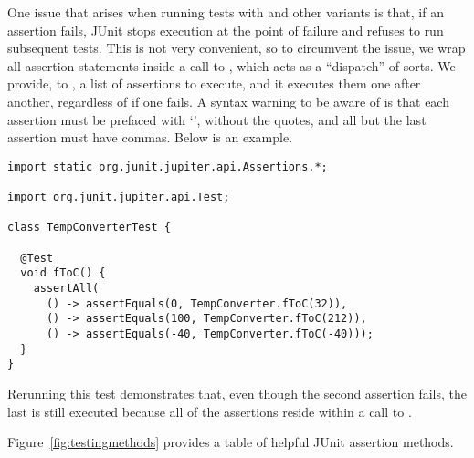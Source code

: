One issue that arises when running tests with  and other variants is that, if an assertion fails, JUnit stops execution at the point of failure and refuses to run subsequent tests.
This is not very convenient, so to circumvent the issue, we wrap all assertion statements inside a call to , which acts as a ``dispatch'' of sorts. 
We provide, to , a list of assertions to execute, and it executes them one after another, regardless of if one fails. 
A syntax warning to be aware of is that each assertion must be prefaced with `\ttt{() -> }', without the quotes, and all but the last assertion must have commas. 
Below is an example.

\begin{lstlisting}[language=MyJava]
import static org.junit.jupiter.api.Assertions.*;

import org.junit.jupiter.api.Test;
  
class TempConverterTest {

  @Test
  void fToC() {
    assertAll(
      () -> assertEquals(0, TempConverter.fToC(32)),
      () -> assertEquals(100, TempConverter.fToC(212)),
      () -> assertEquals(-40, TempConverter.fToC(-40)));
  }
}
\end{lstlisting}
Rerunning this test demonstrates that, even though the second assertion fails, the last is still executed because all of the assertions reside within a call to . 

Figure~\ref{fig:testingmethods} provides a table of helpful JUnit assertion methods.

